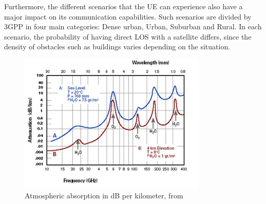 Furthermore, the different scenarios that the \ac{UE} can experience also have a major impact on its communication capabilities. Such scenarios are divided by \ac{3GPP} in four main categories: Dense urban, Urban, Suburban and Rural. In each scenario, the probability of having direct \ac{LOS} with a satellite differs, since the density of obstacles such as buildings varies depending on the situation.



\begin{figure}[ht]
    \centering
    \includegraphics[width=0.8\textwidth]{res/atm-absorp.jpg}
    \caption{Atmospheric absorption in dB per kilometer, from \cite{e-band-ammar}}
    \label{fig:atmospheric-abs}
\end{figure}



